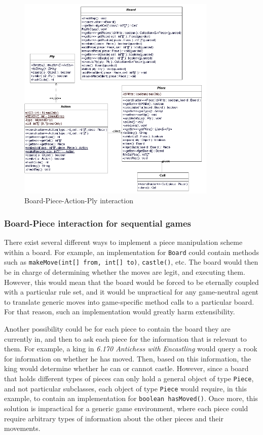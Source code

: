 		\begin{figure}
			\begin{center}
				\includegraphics[width=270pt]{img/board-piece-action-ply.png}
						\caption{Board-Piece-Action-Ply interaction}
	  			\label{board-piece}
		   \end{center}
	\end{figure}
		 		 
	 		 \subsubsection{Board-Piece interaction for sequential games}\label{board-discussion}
	 		 		There exist several different ways to implement a piece manipulation scheme within a board. 
	 		 		For example, an implementation for \texttt{Board} could contain methods such as 
	 		 		\texttt{makeMove(int[] from, int[] to)}, \texttt{castle()}, etc.
	 		 		The board would then be in charge of determining whether the moves are legit, and
	 		 		executing them. However, this would mean that the board would be forced to be 
	 		 		eternally coupled with a particular rule set, and it would be unpractical for any 
	 		 		game-neutral agent to translate generic moves into game-specific method calls to a particular
	 		 		board. For that reason, such an implementation would greatly harm extensibility. 
	 		 		
	 		 		Another possibility could be for each piece to contain the board they are currently in, 
	 		 		and then to ask each piece for the information that is relevant to them. For example, 
	 		 		a king in \emph{6.170 Antichess with Encastling} would query a rook for information 
	 		 		on whether he has moved. Then, based on this information, the king would determine whether
	 		 		he can or cannot castle. However, since a board that holds different types of pieces can 
	 		 		only hold a general object of type \texttt{Piece}, and not particular subclasses, 
	 		 		each object of type \texttt{Piece} would require, in this example, to contain an implementation for
	 		 		\texttt{boolean hasMoved()}. Once more, this solution is impractical for a generic game environment, 
	 		 		where each piece could require arbitrary types of information about the other pieces and their 
	 		 		movements.   
	 		 		
